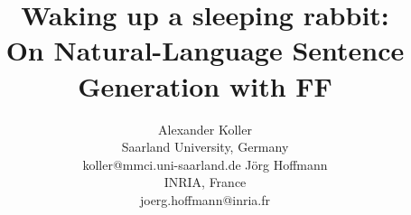 \documentclass[letterpaper]{article}
\begin{document}
\title{Waking up a sleeping rabbit:\\ On Natural-Language Sentence Generation with FF}


\author{
Alexander Koller \\ Saarland University, Germany \\ koller@mmci.uni-saarland.de
\And
J\"org Hoffmann \\ INRIA, France \\ joerg.hoffmann@inria.fr
}


\maketitle












\end{document}
